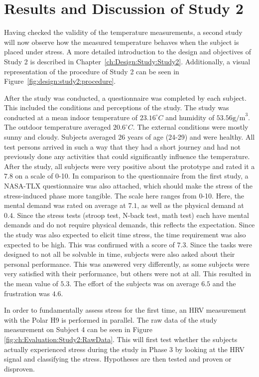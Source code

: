 \clearpage
\section{Results and Discussion of Study 2}
\label{sec:Evaluation:Study2}
Having checked the validity of the temperature measurements, a second study will now observe how the measured temperature behaves when the subject is placed under stress.
A more detailed introduction to the design and objectives of Study 2 is described in Chapter~\ref{ch:Design:Study:Study2}.
Additionally, a visual representation of the procedure of Study 2 can be seen in Figure~\ref{fig:design:study2:procedure}.

After the study was conducted, a questionnaire was completed by each subject. 
This included the conditions and perceptions of the study. 
The study was conducted at a mean indoor temperature of $23.16 ^\circ C$ and humidity of $53.56 \text{g/m}^3$. 
The outdoor temperature averaged $20.6 ^\circ C$.
The external conditions were mostly sunny and cloudy.
Subjects averaged 26 years of age (24-29) and were healthy.
All test persons arrived in such a way that they had a short journey and had not previously done any activities that could significantly influence the temperature.
After the study, all subjects were very positive about the prototype and rated it a $7.8$ on a scale of 0-10.
In comparison to the questionnaire from the first study, a NASA-TLX questionnaire was also attached, which should make the stress of the stress-induced phase more tangible.
The scale here ranges from 0-10.
Here, the mental demand was rated on average at $7.1$, as well as the physical demand at $0.4$. 
Since the stress tests (stroop test, N-back test, math test) each have mental demands and do not require physical demands, this reflects the expectation.
Since the study was also expected to elicit time stress, the time requirement was also expected to be high.
This was confirmed with a score of $7.3$.
Since the tasks were designed to not all be solvable in time, subjects were also asked about their personal performance.
This was answered very differently, as some subjects were very satisfied with their performance, but others were not at all. 
This resulted in the mean value of $5.3$.
The effort of the subjects was on average $6.5$ and the frustration was $4.6$.

In order to fundamentally assess stress for the first time, an HRV measurement with the Polar H9 is performed in parallel.
The raw data of the study measurement on Subject 4 can be seen in Figure \ref{fig:ch:Evaluation:Study2:RawData}.
This will first test whether the subjects actually experienced stress during the study in Phase 3 by looking at the HRV signal and classifying the stress.
Hypotheses are then tested and proven or disproven.

